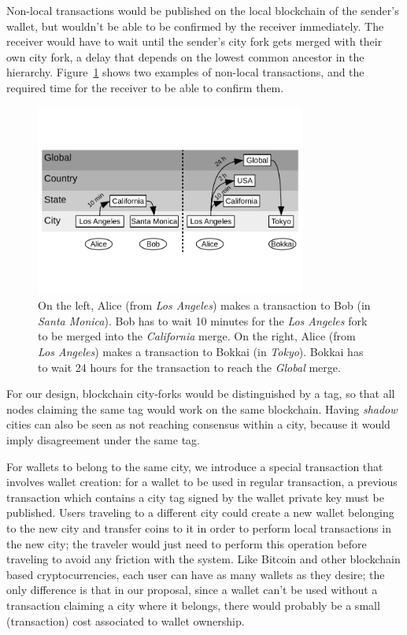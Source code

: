 Non-local transactions would be published on the local blockchain of the
sender's wallet, but wouldn't be able to be confirmed by the receiver
immediately.  The receiver would have to wait until the sender's city fork gets
merged with their own city fork, a delay that depends on the lowest common
ancestor in the hierarchy.  Figure~\ref{fig:non-local-tx} shows two examples of
non-local transactions, and the required time for the receiver to be able to
confirm them.

\begin{figure}
\includegraphics[trim={0.1in 0.8in 0.1in 0.4in},clip,width=3.5in]{non-local-tx}
\caption{On the left, Alice (from \textit{Los Angeles}) makes a transaction to
Bob (in \textit{Santa Monica}).  Bob has to wait 10 minutes for the \textit{Los
Angeles} fork to be merged into the \textit{California} merge.  On the right,
Alice (from \textit{Los Angeles}) makes a transaction to Bokkai (in
\textit{Tokyo}).  Bokkai has to wait 24 hours for the transaction to reach the
\textit{Global} merge.}
\label{fig:non-local-tx}
\end{figure}

For our design, blockchain city-forks would be distinguished by a tag, so that
all nodes claiming the same tag would work on the same blockchain.  Having
\textit{shadow} cities can also be seen as not reaching consensus within a city,
because it would imply disagreement under the same tag.

For wallets to belong to the same city, we introduce a special transaction that
involves wallet creation: for a wallet to be used in regular transaction, a
previous transaction which contains a city tag signed by the wallet private key
must be published.  Users traveling to a different city could create a new
wallet belonging to the new city and transfer coins to it in order to perform
local transactions in the new city; the traveler would just need to perform
this operation before traveling to avoid any friction with the system.  Like
Bitcoin and other blockchain based cryptocurrencies, each user can have as many
wallets as they desire; the only difference is that in our proposal, since a
wallet can't be used without a transaction claiming a city where it belongs,
there would probably be a small (transaction) cost associated to wallet
ownership.

